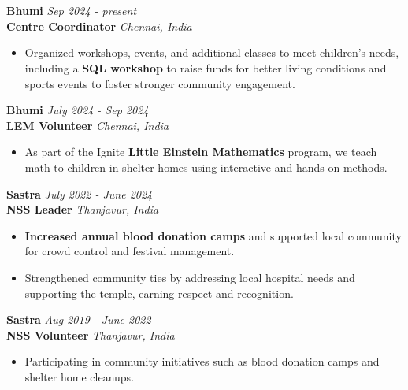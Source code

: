 \documentclass[a4paper,10pt]{article}
\begin{document}
\section{\scshape\color{Fuchsia}{\faHandsHelping\ \textbf VOLUNTEERING \& EXTRACURRICULAR}}
\textbf{Bhumi} \href{https://www.bhumi.ngo/}{} \hfill \textit{Sep 2024 - present} \\
\textbf{Centre Coordinator} \hfill \textit{Chennai, India}
\vspace{-2mm}
\begin{itemize}
    \item Organized workshops, events, and additional classes to meet children's needs, including a \textbf{SQL workshop} to raise funds for better living conditions and sports events to foster stronger community engagement.
\end{itemize}
\vspace{-2mm}
\textbf{Bhumi} \hfill \textit{July 2024 - Sep 2024} \\
\textbf{LEM Volunteer} \hfill \textit{Chennai, India}
\vspace{-2mm}
\begin{itemize}
    \item As part of the Ignite \textbf{Little Einstein Mathematics} program, we teach math to children in shelter homes using interactive and hands-on methods.
\end{itemize}
\vspace{-2mm}
\textbf{Sastra} \hfill \textit{July 2022 - June 2024} \\
\textbf{NSS Leader} \hfill \textit{Thanjavur, India}
\vspace{-2mm}
\begin{itemize}
    \item \textbf{Increased annual blood donation camps} and supported local community for crowd control and festival management.
    \vspace{-2mm}
    \item Strengthened community ties by addressing local hospital needs and supporting the temple, earning respect and recognition.
\end{itemize}
\vspace{-2mm}
\textbf{Sastra} \hfill \textit{Aug 2019 - June 2022} \\
\textbf{NSS Volunteer} \hfill \textit{Thanjavur, India}
\vspace{-2mm}
\begin{itemize}
    \item Participating in community initiatives such as blood donation camps and shelter home cleanups.
\end{itemize}
\end{document}
